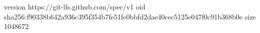 version https://git-lfs.github.com/spec/v1
oid sha256:f90338b642a936c395f354b7fe51fe0bbfd2dae40cec5125e047f0c91b368b0e
size 1048672

